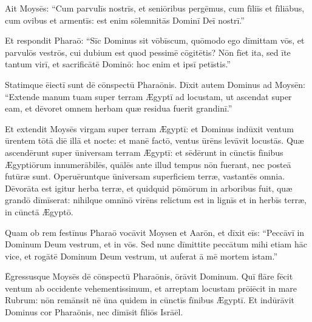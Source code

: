 Ait Moysēs: ``Cum parvulīs nostrīs, et seniōribus
pergēmus, cum fīliīs et fīliābus, cum ovibus et armentīs:
est enim sōlemnitās Dominī Deī nostrī.''

Et respondit
Pharaō: ``Sīc Dominus sit vōbīscum, quōmodo ego dīmittam
vōs, et parvulōs vestrōs, cui dubium est quod pessimē cōgitētis? Nōn
fīet ita, sed īte tantum virī, et sacrificātē Dominō: hoc enim et ipsī
petīstis.''

Statimque ēiectī sunt dē cōnspectū Pharaōnis. Dīxit autem
Dominus ad Moysēn: ``Extende manum tuam super terram Ægyptī ad locustam, ut
ascendat super eam, et dēvoret omnem herbam quæ residua
fuerit grandinī.''

Et extendit Moysēs virgam super terram Ægyptī: et
Dominus indūxit ventum ūrentem tōtā diē illā et nocte: et manē factō,
ventus ūrēns levāvit locustās. Quæ ascendērunt super
ūniversam terram Ægyptī: et sēdērunt in cūnctīs fīnibus Ægyptiōrum
innumerābilēs, quālēs ante illud tempus nōn fuerant, nec
posteā futūræ sunt. Operuēr\-untque ūniversam superficiem terræ,
vastantēs omnia. Dēvorāta est igitur herba terræ, et
quid\-quid pōmōrum in arboribus fuit, quæ grandō dīmīserat:
nihilque omnīnō virēns relictum est in lignīs et
in herbīs terræ, in cūnctā Ægyptō.

Quam ob rem festīnus
Pharaō vocāvit Moysen et Aarōn, et dīxit eīs: ``Peccāvī in Dominum Deum vestrum, et in vōs. Sed nunc
dīmittite peccātum mihi etiam hāc vice, et rogātē Dominum Deum vestrum, ut
auferat ā mē mortem istam.''

Ēgressusque Moysēs dē cōnspectū Pharaōnis,
ōrāvit Dominum. Quī flāre fēcit ventum ab occidente
vehementissimum, et arreptam locustam
prōiēcit in mare Rubrum: nōn remānsit nē ūna quidem in cūnctīs fīnibus
Ægyptī. Et indūrāvit Dominus cor Pharaōnis, nec dīmīsit fīliōs
Isrāēl.  

